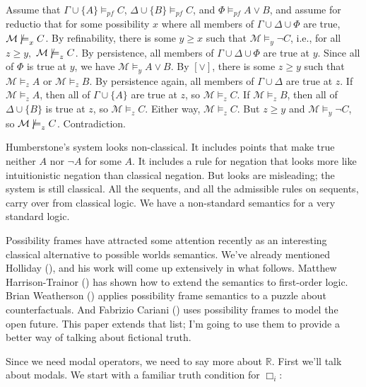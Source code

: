 \documentclass[
  11pt,
  letterpaper,
  DIV=11,
  numbers=noendperiod,
  twoside]{scrartcl}
\newcommand{\nmodels}{\mathrel{\ooalign{$\models$\cr\raisebox{-0.001ex}{\hss$\mkern-1mu/\hss$}}}}
\begin{document}
Assume that \(\Gamma \cup \{A\} \vDash_{pf} C\),
\(\Delta \cup \{B\} \vDash_{pf} C\), and \(\Phi \vDash_{pf} A \vee B\),
and assume for reductio that for some possibility \(x\) where all
members of \(\Gamma \cup \Delta \cup \Phi\) are true,
\(\mathcal{M} \nmodels_x C\). By refinability, there is some
\(y \geqslant x\) such that \(\mathcal{M} \models_y \neg C\), i.e., for
all \(z \geqslant y,\) \(\mathcal{M} \nmodels_z C\). By persistence, all
members of \(\Gamma \cup \Delta \cup \Phi\) are true at \(y\). Since all
of \(\Phi\) is true at \(y\), we have
\(\mathcal{M} \models_y A \vee B\). By \([\vee]\), there is some
\(z \geqslant y\) such that \(\mathcal{M} \models_z A\) or
\(\mathcal{M} \models_z B\). By persistence again, all members of
\(\Gamma \cup \Delta\) are true at \(z\). If
\(\mathcal{M} \models_z A\), then all of \(\Gamma \cup \{A\}\) are true
at \(z\), so \(\mathcal{M} \models_z C\). If
\(\mathcal{M} \models_z B\), then all of \(\Delta \cup \{B\}\) is true
at \(z\), so \(\mathcal{M} \models_z C\). Either way,
\(\mathcal{M} \models_z C\). But \(z \geqslant y\) and
\(\mathcal{M} \models_y \neg C\), so \(\mathcal{M} \nmodels_z C\).
Contradiction.

Humberstone's system looks non-classical. It includes points that make
true neither \(A\) nor \(\neg A\) for some \(A\). It includes a rule for
negation that looks more like intuitionistic negation than classical
negation. But looks are misleading; the system is still classical. All
the sequents, and all the admissible rules on sequents, carry over from
classical logic. We have a non-standard semantics for a very standard
logic.

Possibility frames have attracted some attention recently as an
interesting classical alternative to possible worlds semantics. We've
already mentioned Holliday (), and his
work will come up extensively in what follows. Matthew Harrison-Trainor
() has shown how to extend the
semantics to first-order logic. Brian Weatherson
() applies possibility frame
semantics to a puzzle about counterfactuals. And Fabrizio Cariani
() uses possibility frames to model the
open future. This paper extends that list; I'm going to use them to
provide a better way of talking about fictional truth.

Since we need modal operators, we need to say more about \(\mathbb{R}\).
First we'll talk about modals. We start with a familiar truth condition
for \(\Box_i\):
\end{document}
